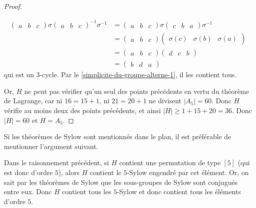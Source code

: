 \begin{proof}
\begin{itemize}
      \begin{align*}
        \begin{pmatrix} a & b & c \end{pmatrix} \sigma \begin{pmatrix} a & b & c \end{pmatrix}^{-1} \sigma^{-1} &= \begin{pmatrix} a & b & c \end{pmatrix} \sigma \begin{pmatrix} c & b & a \end{pmatrix} \sigma^{-1} \\
        &= \begin{pmatrix} a & b & c \end{pmatrix} \begin{pmatrix} \sigma(c) & \sigma(b) & \sigma(a) \end{pmatrix} \\
        &= \begin{pmatrix} a & b & c \end{pmatrix} \begin{pmatrix} d & c & b \end{pmatrix} \\
        &= \begin{pmatrix} b & d & a \end{pmatrix}
      \end{align*}
      qui est un $3$-cycle. Par le \cref{simplicite-du-groupe-alterne-1}, il les contient tous.
    \end{itemize}
    Or, $H$ ne peut pas vérifier qu'un seul des points précédents en vertu du théorème de Lagrange, car ni $16 = 15 + 1$, ni $21 = 20 + 1$ ne divisent $|A_5| = 60$. Donc $H$ vérifie au moins deux des points précédents, et ainsi $|H| \geq 1 + 15 + 20 = 36$. Donc $|H|=60$ et $H = A_5$.
  \end{proof}


  Si les théorèmes de Sylow sont mentionnés dans le plan, il est préférable de mentionner l'argument suivant.

  \begin{remark}
    Dans le raisonnement précédent, si $H$ contient une permutation de type $[5]$ (qui est donc d'ordre $5$), alors $H$ contient le $5$-Sylow engendré par cet élément. Or, on sait par les théorèmes de Sylow que les sous-groupes de Sylow sont conjugués entre eux. Donc $H$ contient tous les $5$-Sylow et donc contient tous les éléments d'ordre $5$.
  \end{remark}

